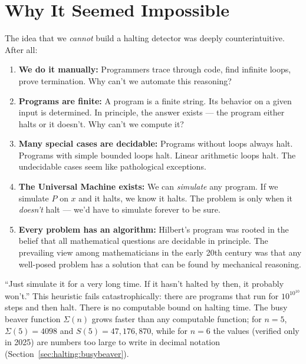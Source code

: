 \section{Why It Seemed Impossible}
\label{sec:halting:impossible}

The idea that we \emph{cannot} build a halting detector was deeply counterintuitive. After all:

\begin{enumerate}
\item \textbf{We do it manually:} Programmers trace through code, find infinite loops, prove termination. Why can't we automate this reasoning?

\item \textbf{Programs are finite:} A program is a finite string. Its behavior on a given input is determined. In principle, the answer exists — the program either halts or it doesn't. Why can't we compute it?

\item \textbf{Many special cases are decidable:} Programs without loops always halt. Programs with simple bounded loops halt. Linear arithmetic loops halt. The undecidable cases seem like pathological exceptions.

\item \textbf{The Universal Machine exists:} We can \emph{simulate} any program. If we simulate $P$ on $x$ and it halts, we know it halts. The problem is only when it \emph{doesn't} halt — we'd have to simulate forever to be sure.

\item \textbf{Every problem has an algorithm:} Hilbert's program was rooted in the belief that all mathematical questions are decidable in principle. The prevailing view among mathematicians in the early 20th century was that any well-posed problem has a solution that can be found by mechanical reasoning.
\end{enumerate}

``Just simulate it for a very long time. If it hasn't halted by then, it probably won't.'' This heuristic fails catastrophically: there are programs that run for $10^{10^{10}}$ steps and then halt. There is no computable bound on halting time. The busy beaver function $\Sigma(n)$ grows faster than any computable function; for $n=5$, $\Sigma(5) = 4098$ and $S(5) = 47,\!176,\!870$, while for $n=6$ the values (verified only in 2025) are numbers too large to write in decimal notation (Section~\ref{sec:halting:busybeaver}).

